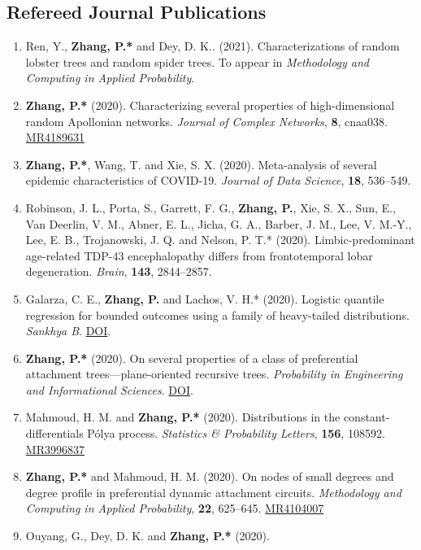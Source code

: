 \documentclass[margin]{res}
\def\MR#1{\href{http://www.ams.org/mathscinet-getitem?mr=#1}{MR#1}}
\begin{document}
\begin{resume}
\subsection{Refereed Journal Publications}
\begin{enumerate}
	\item {\sc Ren, Y.}, {\bf Zhang, P.*} and {\sc Dey, D. K.}. 
	(2021). Characterizations of random lobster trees and random 
	spider trees. To appear in {\em Methodology and Computing in 
	Applied Probability}.
	\item {\bf Zhang, P.*} (2020). Characterizing several 
	properties of high-dimensional random Apollonian networks. {\em 
	Journal of Complex Networks}, {\bf 8}, cnaa038. \MR{4189631}
	\item {\bf Zhang, P.*}, {\sc Wang, T.} and {\sc Xie, S. X.} 
	(2020). Meta-analysis of several epidemic characteristics of 
	COVID-19. {\em Journal of Data Science}, {\bf 18}, 536--549.
	\item {\sc Robinson, J. L., Porta, S., Garrett, F. G.}, {\sc \bf 
	Zhang, P.}, {\sc Xie, S. X., Sun, E., Van Deerlin, V. M., Abner, 
	E. L., Jicha, G. A., Barber, J. M., Lee, V. M.-Y., Lee, E. B., 
	Trojanowski, J. Q.} and {\sc Nelson, P. T.*} (2020). 
	Limbic-predominant age-related TDP-43 encephalopathy differs 
	from frontotemporal lobar degeneration. {\em Brain}, {\bf 143}, 
	2844--2857.
	\item {\sc Galarza, C. E.}, {\bf Zhang, P.} and {\sc Lachos, 
	V. H.*} (2020). Logistic quantile regression for bounded 
	outcomes 
	using a family of heavy-tailed distributions. {\em Sankhya B}. 
	\href{https://doi.org/10.1007/s13571-020-00231-0}{DOI}.
	\item {\bf Zhang, P.*} (2020). On several properties of a 
	class of preferential attachment trees---plane-oriented 
	recursive trees. {\em Probability in Engineering and 
	Informational Sciences}. 
	\href{https://doi.org/10.1017/S0269964820000261}{DOI}.
	\item {\sc Mahmoud, H. M.} and {\bf Zhang, P.*} (2020). 
	Distributions in the constant-differentials P\'{o}lya process. 
	{\em Statistics \& Probability Letters}, \textbf{156}, 108592. 
	\MR{3996837}
	\item {\bf Zhang, P.*} and {\sc Mahmoud, H. M.} (2020). On 
	nodes of small degrees and degree profile in preferential 
	dynamic attachment circuits. {\em Methodology and Computing in 
	Applied Probability}, \textbf{22}, 625--645. \MR{4104007}
	\item {\sc Ouyang, G., Dey, D. K.} and {\bf Zhang, P.*} (2020). 

\end{enumerate}
\end{resume}
\end{document}
